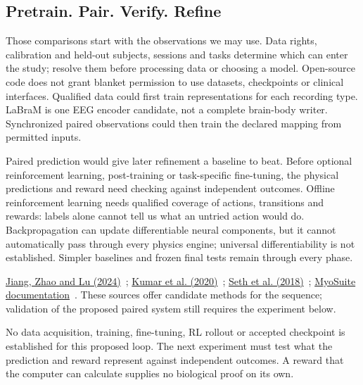 \subsection{Pretrain. Pair. Verify. Refine}
Those comparisons start with the observations we may use. Data rights,
calibration and held-out subjects, sessions and tasks determine which can
enter the study; resolve them before processing data or choosing a model.
Open-source code does not grant blanket permission to use datasets,
checkpoints or clinical interfaces. Qualified data could first train
representations for each recording type. LaBraM is one EEG encoder candidate,
not a complete brain-body writer. Synchronized paired observations could
then train the declared mapping from permitted inputs.

Paired prediction would give later refinement a baseline to beat. Before
optional reinforcement learning, post-training or task-specific fine-tuning,
the physical predictions and reward need checking against independent
outcomes. Offline reinforcement learning needs qualified coverage of actions,
transitions and rewards: labels alone cannot tell us what an untried action
would do. Backpropagation can update differentiable neural components, but
it cannot automatically pass through every physics engine; universal
differentiability is not established. Simpler baselines and frozen final
tests remain through every phase.
\par\noindent \href{https://arxiv.org/html/2405.18765v1}{Jiang, Zhao and Lu (2024)}~\cite{labram2024}; \href{https://arxiv.org/abs/2006.04779v3}{Kumar et al. (2020)}~\cite{cql2020}; \href{https://journals.plos.org/ploscompbiol/article?id=10.1371/journal.pcbi.1006223}{Seth et al. (2018)}~\cite{opensim2018}; \href{https://myosuite.readthedocs.io/en/latest/}{MyoSuite documentation}~\cite{myosuiteDocsUndated}. These sources offer candidate methods for the sequence; validation of the proposed paired system still requires the experiment below.

No data acquisition, training, fine-tuning, RL rollout or accepted checkpoint
is established for this proposed loop. The next experiment must test what
the prediction and reward represent against independent outcomes. A reward
that the computer can calculate supplies no biological proof on its own.

